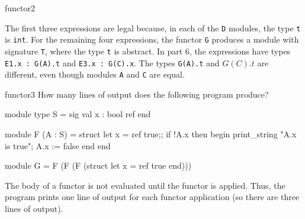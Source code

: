 \begin{exercise}{functor2}
\begin{answer}\ifanswers
The first three expressions are legal because, in each of
the \hbox{\lstinline$D$} modules, the type \hbox{\lstinline$t$}
is \hbox{\lstinline$int$}.  For the remaining four expressions, the
functor \hbox{\lstinline$G$} produces a module with
signature \hbox{\lstinline$T$}, where the type \hbox{\lstinline$t$} is
abstract.  In part 6, the expressions have types
%
\hbox{\lstinline$E1.x : G(A).t$} and \hbox{\lstinline$E3.x : G(C).x$}.
%
The types \hbox{\lstinline$G(A).t$} and $G(C).t$ are different, even
though modules \hbox{\lstinline$A$} and \hbox{\lstinline$C$} are
equal.
\fi\end{answer}
\end{exercise}

%
%
\begin{exercise}{functor3}
How many lines of output does the following program produce?

\begin{ocaml}
module type S = sig val x : bool ref end

module F (A : S) =
struct
   let x = ref true;;
   if !A.x then begin
       print_string "A.x is true\n";
       A.x := false
   end
end

module G = F (F (F (struct let x = ref true end)))
\end{ocaml}

\begin{answer}\ifanswers
The body of a functor is not evaluated until the functor is applied.
Thus, the program prints one line of output for each functor
application (so there are three lines of output).
\fi\end{answer}
\end{exercise}

